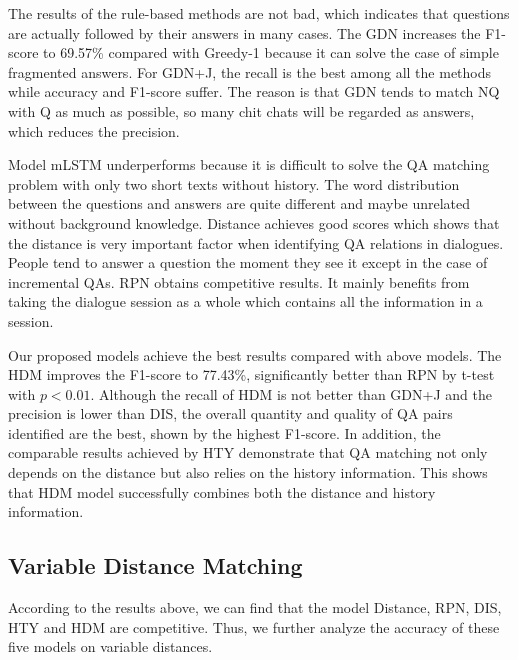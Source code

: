 The results of the rule-based methods are not bad, which indicates that questions 
are actually followed by their answers in many cases. The GDN increases the F1-score 
to 69.57\% compared with Greedy-1 because it can solve the case of simple fragmented 
answers. For GDN+J, the recall is the best among all the methods while accuracy and 
F1-score suffer. 
The reason is that GDN tends to match NQ with Q as much as possible, so many chit chats will be regarded as answers, which reduces the precision.

Model mLSTM underperforms because it is difficult to solve the QA matching problem with 
only two short texts without history. The word distribution between the questions 
and answers are quite different and maybe unrelated without background knowledge. 
Distance achieves good scores which shows that the distance is very important factor 
when identifying QA relations in dialogues. People tend to answer a question 
the moment they see it except in the case of incremental QAs. RPN obtains competitive 
results. It mainly benefits from taking the dialogue session as a whole which 
contains all the information in a session. 
 
Our proposed models achieve the best results compared with above models. 
The HDM improves the F1-score to 77.43\%, significantly better than RPN by t-test with
$p<0.01$. 
Although the recall of HDM is not better than GDN+J and the precision is 
lower than DIS, the overall quantity and quality of QA pairs identified 
are the best, shown by the highest F1-score. 
In addition, the comparable results achieved by HTY demonstrate that 
QA matching not only depends on 
the distance but also relies on the history information.
This shows that HDM model successfully combines both the distance and history 
information.

\subsection{Variable Distance Matching}

 According to the results above, we can find that the model Distance, RPN, DIS, HTY and HDM are competitive. Thus, we further analyze the accuracy of these five models on variable distances.

